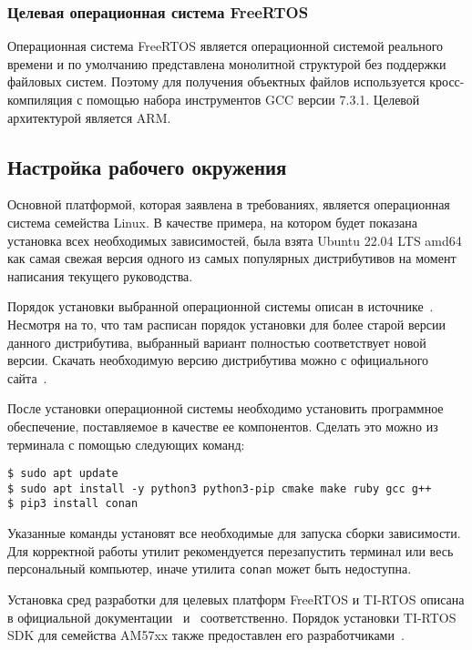 
\subsubsection{Целевая операционная система FreeRTOS}

Операционная система FreeRTOS является операционной системой реального времени
и по умолчанию представлена монолитной структурой без поддержки файловых систем.
Поэтому для получения объектных файлов используется кросс-компиляция
с помощью набора инструментов GCC версии 7.3.1. Целевой архитектурой
является ARM.

\subsection{Настройка рабочего окружения}

Основной платформой, которая заявлена в требованиях,
является операционная система семейства Linux.
В качестве примера, на котором будет показана установка всех необходимых
зависимостей, была взята Ubuntu 22.04 LTS amd64 как самая свежая версия одного из самых популярных дистрибутивов на момент написания текущего руководства.


Порядок установки выбранной операционной системы описан в источнике~\cite{ubuntu_how_to_install}.
Несмотря на то, что там расписан порядок установки для более старой версии данного дистрибутива, выбранный вариант полностью соответствует новой версии.
Скачать необходимую версию дистрибутива можно с официального сайта~\cite{ubuntu_download_site}.

После установки операционной системы необходимо установить программное обеспечение, поставляемое в качестве ее компонентов.
Сделать это можно из терминала с помощью следующих команд:

\begin{lstlisting}
$ sudo apt update
$ sudo apt install -y python3 python3-pip cmake make ruby gcc g++
$ pip3 install conan
\end{lstlisting}

Указанные команды установят все необходимые для запуска сборки зависимости.
Для корректной работы утилит рекомендуется перезапустить терминал или весь
персональный компьютер, иначе утилита \lstinline{conan} может быть недоступна.

Установка сред разработки для целевых платформ FreeRTOS и TI-RTOS описана в официальной документации~\cite{st_cubeide_install} и~\cite{ti_ccs_install} соответственно.
Порядок установки TI-RTOS SDK для семейства AM57xx также предоставлен его разработчиками~\cite{ti_sdk_install}.

